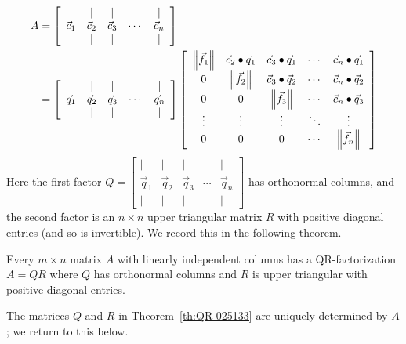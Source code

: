 \documentclass{ximera}
\begin{document}
\begin{align}
A & = \left[ \begin{array}{ccccc}
|&|&|& &| \\
\vec{c}_{1} & \vec{c}_{2} & \vec{c}_{3} &\cdots &  \vec{c}_{n}\\
|&|&|& &|
\end{array}\right] \nonumber \\
&= \left[ \begin{array}{ccccc}
|&|&|& &| \\
\vec{q}_{1} & \vec{q}_{2} & \vec{q}_{3} & \cdots &  \vec{q}_{n}\\
|&|&|& &|
\end{array}\right] \left[ \begin{array}{ccccc}
\left\| \vec{f}_{1} \right\| & \vec{c}_{2} \bullet \vec{q}_{1} & \vec{c}_{3} \bullet \vec{q}_{1} & \cdots & \vec{c}_{n} \bullet \vec{q}_{1} \\
0 & \left\| \vec{f}_{2} \right\| & \vec{c}_{3} \bullet \vec{q}_{2} & \cdots & \vec{c}_{n} \bullet \vec{q}_{2} \\
0 & 0 & \left\| \vec{f}_{3} \right\| & \cdots & \vec{c}_{n} \bullet \vec{q}_{3} \\
\vdots & \vdots & \vdots & \ddots & \vdots \\
0 & 0 & 0 & \cdots & \left\| \vec{f}_{n} \right\|
\end{array} \right] \label{matrixFactEq}
\end{align}
Here the first factor $Q = \left[ \begin{array}{ccccc}
|&|&|& &| \\
\vec{q}_{1} & \vec{q}_{2} & \vec{q}_{3} & \cdots &  \vec{q}_{n}\\
|&|&|& &|
\end{array}\right]$ has orthonormal columns, and the second factor is an $n \times n$ upper triangular matrix $R$ with positive diagonal entries (and so is invertible). We record this in the following theorem.


\begin{theorem}[QR-Factorization]\label{th:QR-025133}
Every $m \times n$ matrix $A$ with linearly independent columns has a QR-factorization $A = QR$ where $Q$ has orthonormal columns and $R$ is upper triangular with positive diagonal entries.
\end{theorem}
    
The matrices $Q$ and $R$ in Theorem~\ref{th:QR-025133} are uniquely determined by $A$; we return to this below.
    
\end{document}

